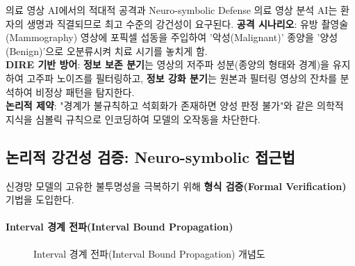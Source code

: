\begin{practicaltool}{의료 영상 AI에서의 적대적 공격과 Neuro-symbolic Defense}
의료 영상 분석 AI는 환자의 생명과 직결되므로 최고 수준의 강건성이 요구된다.
\textbf{공격 시나리오}: 유방 촬영술(Mammography) 영상에 포픽셀 섭동을 주입하여 '악성(Malignant)' 종양을 '양성(Benign)'으로 오분류시켜 치료 시기를 놓치게 함.\\
\textbf{DIRE 기반 방어}: \textbf{정보 보존 분기}는 영상의 저주파 성분(종양의 형태와 경계)을 유지하여 고주파 노이즈를 필터링하고, \textbf{정보 강화 분기}는 원본과 필터링 영상의 잔차를 분석하여 비정상 패턴을 탐지한다.\\
\textbf{논리적 제약}: "경계가 불규칙하고 석회화가 존재하면 양성 판정 불가"와 같은 의학적 지식을 심볼릭 규칙으로 인코딩하여 모델의 오작동을 차단한다.
\end{practicaltool}

\subsection{논리적 강건성 검증: Neuro-symbolic 접근법}
\label{sec:15.1.3}

신경망 모델의 고유한 불투명성을 극복하기 위해 \textbf{형식 검증(Formal Verification)} 기법을 도입한다.

\paragraph{Interval 경계 전파(Interval Bound Propagation)}

\begin{figure}[htbp]
\centering
{}
\caption{Interval 경계 전파(Interval Bound Propagation) 개념도}
\label{fig:ibp_concept}
\end{figure}

